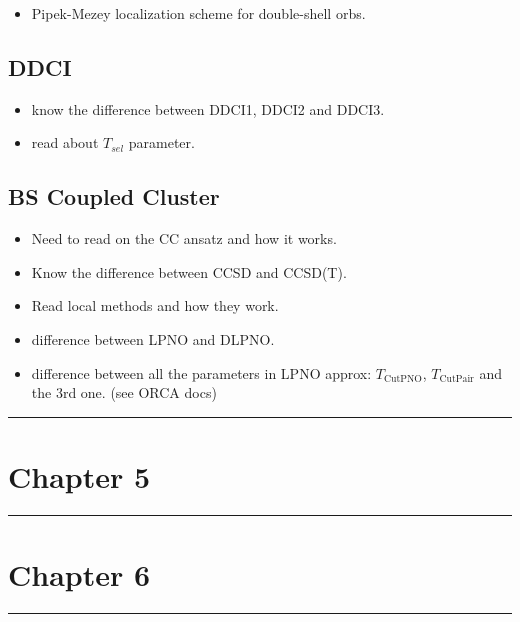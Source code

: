 \documentclass{article}
\newcommand*\sepline
{
  \begin{center}
    \rule[1ex]{.5\textwidth}{.5pt}
  \end{center}
}
\begin{document}
\begin{itemize}
    \item Pipek-Mezey localization scheme for double-shell orbs.
\end{itemize}

\subsection{DDCI}

\begin{itemize}
    \item know the difference between DDCI1, DDCI2 and DDCI3.
    \item read about $T_{sel}$ parameter.
\end{itemize}

\subsection{BS Coupled Cluster}

\begin{itemize}
    \item Need to read on the CC ansatz and how it works.
    \item Know the difference between CCSD and CCSD(T).
    \item Read local methods and how they work.
    \item difference between LPNO and DLPNO.
    \item difference between all the parameters in LPNO approx: $T_{\text{CutPNO}}$, $T_{\text{CutPair}}$ and the 3rd one. (see ORCA docs)
\end{itemize}

\sepline

\section{Chapter 5}

\sepline

\section{Chapter 6}

\sepline

\end{document}
